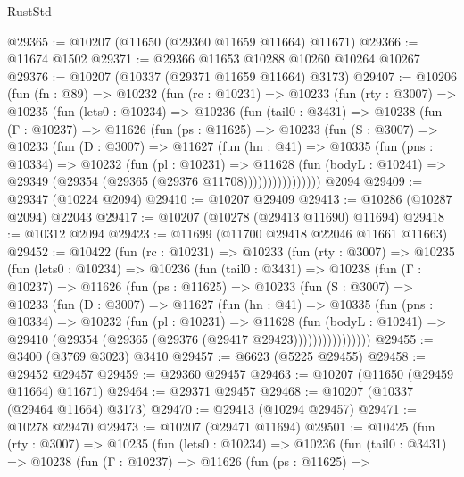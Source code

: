 \begin{lexlean}{RustStd}
\begin{coremodule}
@29365 := @10207 (@11650 (@29360 @11659 @11664) @11671)
@29366 := @11674 @1502
@29371 := @29366 @11653 @10288 @10260 @10264 @10267
@29376 := @10207 (@10337 (@29371 @11659 @11664) @3173)
@29407 := @10206
    (fun (fn : @89) =>
    @10232
      (fun (rc : @10231) =>
      @10233
        (fun (rty : @3007) =>
        @10235
          (fun (lets0 : @10234) =>
          @10236
            (fun (tail0 : @3431) =>
            @10238
              (fun (Γ : @10237) =>
              @11626
                (fun (ps : @11625) =>
                @10233
                  (fun (S : @3007) =>
                  @10233
                    (fun (D : @3007) =>
                    @11627
                      (fun (hn : @41) =>
                      @10335
                        (fun (pns : @10334) =>
                        @10232
                          (fun (pl : @10231) =>
                          @11628
                            (fun (bodyL : @10241) =>
                            @29349 (@29354 (@29365 (@29376 @11708))))))))))))))))
    @2094
@29409 := @29347 (@10224 @2094)
@29410 := @10207 @29409
@29413 := @10286 (@10287 @2094) @22043
@29417 := @10207 (@10278 (@29413 @11690) @11694)
@29418 := @10312 @2094
@29423 := @11699 (@11700 @29418 @22046 @11661 @11663)
@29452 := @10422
    (fun (rc : @10231) =>
    @10233
      (fun (rty : @3007) =>
      @10235
        (fun (lets0 : @10234) =>
        @10236
          (fun (tail0 : @3431) =>
          @10238
            (fun (Γ : @10237) =>
            @11626
              (fun (ps : @11625) =>
              @10233
                (fun (S : @3007) =>
                @10233
                  (fun (D : @3007) =>
                  @11627
                    (fun (hn : @41) =>
                    @10335
                      (fun (pns : @10334) =>
                      @10232
                        (fun (pl : @10231) =>
                        @11628
                          (fun (bodyL : @10241) =>
                          @29410 (@29354 (@29365 (@29376 (@29417 @29423))))))))))))))))
@29455 := @3400 (@3769 @3023) @3410
@29457 := @6623 (@5225 @29455)
@29458 := @29452 @29457
@29459 := @29360 @29457
@29463 := @10207 (@11650 (@29459 @11664) @11671)
@29464 := @29371 @29457
@29468 := @10207 (@10337 (@29464 @11664) @3173)
@29470 := @29413 (@10294 @29457)
@29471 := @10278 @29470
@29473 := @10207 (@29471 @11694)
@29501 := @10425
    (fun (rty : @3007) =>
    @10235
      (fun (lets0 : @10234) =>
      @10236
        (fun (tail0 : @3431) =>
        @10238
          (fun (Γ : @10237) =>
          @11626
            (fun (ps : @11625) =>

\end{coremodule}
\end{lexlean}
